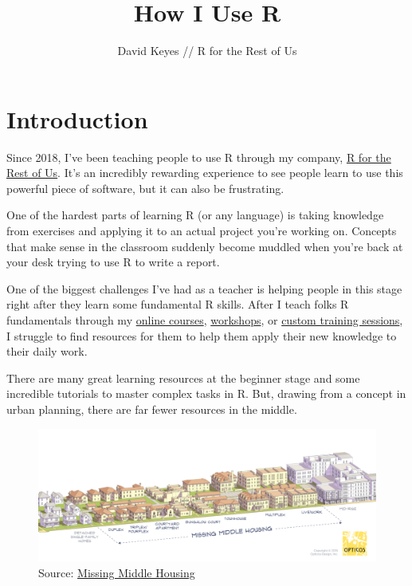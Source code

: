 \documentclass[]{book}
\title{How I Use R}
\author{David Keyes // R for the Rest of Us}
\date{}
\begin{document}
\maketitle

{
\setcounter{tocdepth}{1}
\tableofcontents
}
\hypertarget{introduction}{%
\chapter{Introduction}\label{introduction}}

Since 2018, I've been teaching people to use R through my company, \href{https://rfortherestofus.com/}{R for the Rest of Us}. It's an incredibly rewarding experience to see people learn to use this powerful piece of software, but it can also be frustrating.

One of the hardest parts of learning R (or any language) is taking knowledge from exercises and applying it to an actual project you're working on. Concepts that make sense in the classroom suddenly become muddled when you're back at your desk trying to use R to write a report.

One of the biggest challenges I've had as a teacher is helping people in this stage right after they learn some fundamental R skills. After I teach folks R fundamentals through my \href{https://rfortherestofus.com/courses/fundamentals/}{online courses}, \href{https://rfortherestofus.com/workshops/}{workshops}, or \href{https://rfortherestofus.com/custom-training/}{custom training sessions}, I struggle to find resources for them to help them apply their new knowledge to their daily work.

There are many great learning resources at the beginner stage and some incredible tutorials to master complex tasks in R. But, drawing from a concept in urban planning, there are far fewer resources in the middle.

\begin{figure}
\centering
\includegraphics{assets/missing-middle.png}
\caption{Source: \href{https://missingmiddlehousing.com/}{Missing Middle Housing}}
\end{figure}
\end{document}
